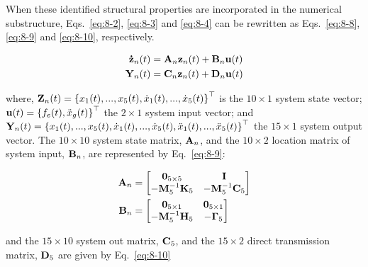 When these identified structural properties are incorporated in the numerical substructure, Eqs.~\eqref{eq:8-2}, \eqref{eq:8-3} and \eqref{eq:8-4} can be rewritten as Eqs.~\eqref{eq:8-8}, \eqref{eq:8-9} and \eqref{eq:8-10}, respectively.

\begin{equation}\label{eq:8-8}
\begin{aligned}
\mathbf{\dot{z}}_{n}(t) & = \mathbf{A}_{n}\mathbf{z}_{n}(t) + \mathbf{B}_{n}\mathbf{u}(t) \\
\mathbf{Y}_{n}(t) & = \mathbf{C}_{n}\mathbf{z}_{n}(t) + \mathbf{D}_{n}\mathbf{u}(t)
\end{aligned}
\end{equation}

where, $\mathbf{Z}_{n}(t) = \left\{ x_{1}(t),...,x_{5}(t),\dot{x}_{1}(t),...,\dot{x}_{5}(t)\right\}^{\top}$ is the $10\times1$ system state vector; $\mathbf{u}(t)=\left\{f_{e}(t), \ddot{x}_{g}(t)\right\}^{\top}$ the $2\times1$ system input vector; and $\mathbf{Y}_{n}(t) = \left\{x_{1}(t),...,x_{5}(t),\dot{x}_{1}(t),...,\dot{x}_{5}(t),\ddot{x}_{1}(t),...,\ddot{x}_{5}(t)\right\}^{\top}$ the $15\times1$ system output vector. The $10\times10$ system state matrix, $\mathbf{A}_{n}$, and the $10\times2$ location matrix of system input, $\mathbf{B}_{n}$, are represented by Eq.~\eqref{eq:8-9}:

\begin{equation}\label{eq:8-9}
\begin{aligned}
\mathbf{A}_{n} & = \begin{bmatrix} \mathbf{0}_{5\times5} & \mathbf{I} \\ -\mathbf{M}_{5}^{-1}\mathbf{K}_{5} & -\mathbf{M}_{5}^{-1}\mathbf{C}_{5}\end{bmatrix} \\
\mathbf{B}_{n} & = \begin{bmatrix} \mathbf{0}_{5\times1} & \mathbf{0}_{5\times1} \\ -\mathbf{M}_{5}^{-1}\mathbf{H}_{5} & -\mathbf{\Gamma}_{5} \end{bmatrix}
\end{aligned}
\end{equation}

and the $15\times10$ system out matrix, $\mathbf{C}_{5}$, and the $15\times2$ direct transmission matrix, $\mathbf{D}_{5}$ are given by Eq.~\eqref{eq:8-10}

